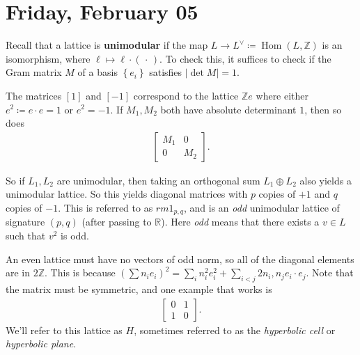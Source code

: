 \hypertarget{friday-february-05}{%
\section{Friday, February 05}\label{friday-february-05}}

\begin{remark}

Recall that a lattice is \textbf{unimodular} if the map
\(L\to L^\vee\coloneqq{\operatorname{Hom}}(L, {\mathbb{Z}})\) is an
isomorphism, where \(\ell \mapsto \ell \cdot ({\,\cdot\,})\). To check
this, it suffices to check if the Gram matrix \(M\) of a basis
\(\left\{{e_i}\right\}\) satisfies
\({\left\lvert { \det M } \right\rvert} = 1\).

\end{remark}

\begin{example}

The matrices \([1]\) and \([-1]\) correspond to the lattice
\({\mathbb{Z}}e\) where either \(e^2 \coloneqq e\cdot e = 1\) or
\(e^2 = -1\). If \(M_1, M_2\) both have absolute determinant \(1\), then
so does
\begin{align*}
\begin{bmatrix}
M_1 & 0 
\\
0 & M_2
\end{bmatrix}
.\end{align*}

So if \(L_1, L_2\) are unimodular, then taking an orthogonal sum
\(L_1 \oplus L_2\) also yields a unimodular lattice. So this yields
diagonal matrices with \(p\) copies of \(+1\) and \(q\) copies of
\(-1\). This is referred to as \(rm{1}_{p, q}\), and is an \emph{odd}
unimodular lattice of signature \((p, q)\) (after passing to
\({\mathbb{R}}\)). Here \emph{odd} means that there exists a \(v\in L\)
such that \(v^2\) is odd.

\end{example}

\begin{example}

An even lattice must have no vectors of odd norm, so all of the diagonal
elements are in \(2{\mathbb{Z}}\). This is because
\((\sum n_i e_i)^2 = \sum_i n_i^2 e_i^2 + \sum_{i<j} 2 n_i, n_j e_i \cdot e_j\).
Note that the matrix must be symmetric, and one example that works is
\begin{align*}
\begin{bmatrix}
0 & 1 
\\
1 & 0
\end{bmatrix}
.\end{align*}
We'll refer to this lattice as \(H\), sometimes referred to as the
\emph{hyperbolic cell} or \emph{hyperbolic plane}.

\end{example}


